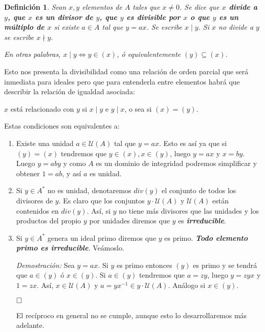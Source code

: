 \documentclass[12pt]{article}
\newtheorem{definition}[theorem]{Definición}
\begin{document}
\begin{definition} Sean $x, y$ elementos de $A$ tales que $x \neq 0$. Se dice que \textbf{$x$ divide a $y$, que $x$ es un divisor de $y$, que $y$ es divisible por $x$ o que $y$ es un múltiplo de $x$} si existe $a \in A$ tal que $y = ax$. Se escribe $x \mid y$. Si $x$ no divide a $y$ se escribe $x \nmid y$.

En otras palabras, $x \mid y \Leftrightarrow y \in (x)$, ó equivalentemente $(y) \subseteq (x)$.
\end{definition}

Esto nos presenta la divisibilidad como una relación de orden parcial que será inmediata para ideales pero que para entenderla entre elementos habrá que describir la relación de igualdad asociada: 

\begin{center}
$x$ está relacionado con $y$ si $x \mid y$ e $y \mid x$, o sea si $(x) = (y).$
\end{center} 
Estas condiciones son equivalentes a: \begin{enumerate}
\item Existe una unidad $a \in \mathcal{U}(A)$ tal que $y = ax$. Esto es así ya que si $(y) = (x)$ tendremos que $y \in (x), x \in (y)$, luego $y = ax$ y $x = by$. Luego $y = aby$ y como $A$ es un dominio de integridad podremos simplificar y obtener $1 = ab$, y así $a$ es unidad.
\item Si $y \in A^{\ast}$ no es unidad, denotaremos $div(y)$ el conjunto de todos los divisores de $y$. Es claro que los conjuntos $y \cdot \mathcal{U}(A)$ y $\mathcal{U}(A)$ están contenidos en $div(y)$. Así, si $y$ no tiene más divisores que las unidades y los productos del propio $y$ por unidades diremos que $y$ es \textbf{\textit{irreducible}}.
\item Si $y \in A^{\ast}$ genera un ideal primo diremos que $y$ es primo. \textbf{\textit{Todo elemento primo es irreducible}}. Veámoslo. 

\emph{Demostración: } Sea $y = ax$. Si $y$ es primo entonces $(y)$ es primo y se tendrá que $a \in (y)$ ó $x \in (y)$. Si $a \in (y)$ tendremos que $a = zy$, luego $y = zyx$ y $1 = zx$. Así, $x \in \mathcal{U}(A)$ y $a = yx^{-1} \in y \cdot \mathcal{U}(A)$. Análogo si $x \in (y)$.

$\hfill \square$

El recíproco en general no se cumple, aunque esto lo desarrollaremos más adelante.
\end{enumerate} 
\end{document}
